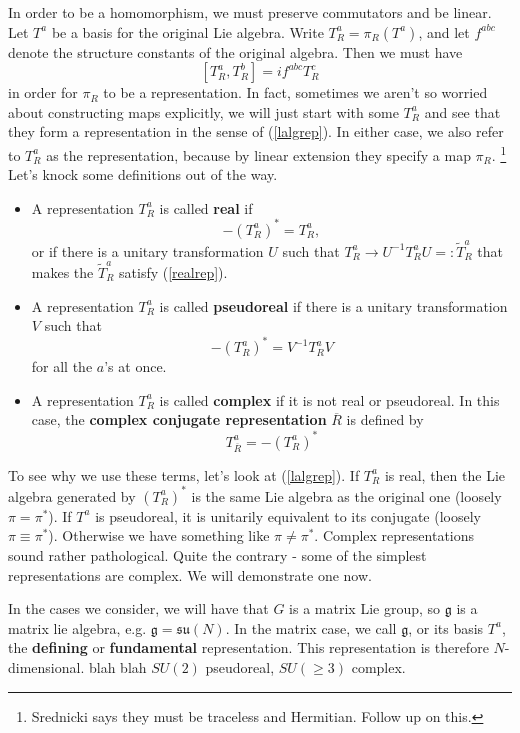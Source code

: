 \documentclass[main.tex]{subfiles}
\begin{document}
In order to be a homomorphism, we must preserve commutators and be linear. Let $T^a$ be a basis for the original Lie algebra. Write $T^a_R = \pi_R (T^a)$, and let $f^{abc}$ denote the structure constants of the original algebra. Then we must have
\begin{equation} \label{lalgrep}
[T^a_R,T^b_R] = i f^{abc} T^c_R
\end{equation}
in order for $\pi_R$ to be a representation. In fact, sometimes we aren't so worried about constructing maps explicitly, we will just start with some $T^a_R$ and see that they form a representation in the sense of (\ref{lalgrep}). In either case, we also refer to $T^a_R$ as the representation, because by linear extension they specify a map $\pi_R$. \footnote{Srednicki says they must be traceless and Hermitian. Follow up on this.} Let's knock some definitions out of the way.
\begin{itemize}
\item A representation $T^a_R$ is called \textbf{real} if 
\begin{equation} \label{realrep}
- (T^a_R)^* = T^a_R,
\end{equation}
or if there is a unitary transformation $U$ such that $T^a_R \to U^{-1} T^a_R U =: \tilde{T}^a_R$ that makes the $\tilde{T}^a_R$ satisfy (\ref{realrep}).
\item A representation $T^a_R$ is called \textbf{pseudoreal} if there is a unitary transformation $V$ such that
\[
-(T^a_R)^* = V^{-1} T^a_R V
\]
for all the $a$'s at once.
\item A representation $T^a_R$ is called \textbf{complex} if it is not real or pseudoreal. In this case, the \textbf{complex conjugate representation} $\overline{R}$ is defined by
\[
T^a_{\overline{R}} = - \left( T^a_R \right)^*
\]
\end{itemize}
To see why we use these terms, let's look at (\ref{lalgrep}). If $T^a_R$ is real, then the Lie algebra generated by $(T^a_R)^*$ is the same Lie algebra as the original one (loosely $\pi = \pi^*$). If $T^a$ is pseudoreal, it is unitarily equivalent to its conjugate (loosely $\pi \equiv \pi^*$). Otherwise we have something like $\pi \neq \pi^*$. Complex representations sound rather pathological. Quite the contrary - some of the simplest representations are complex. We will demonstrate one now.

In the cases we consider, we will have that $G$ is a matrix Lie group, so $\mathfrak{g}$ is a matrix lie algebra, e.g. $\mathfrak{g} = \mathfrak{su}(N)$. In the matrix case, we call $\mathfrak{g}$, or its basis $T^a$, the \textbf{defining} or \textbf{fundamental} representation. This representation is therefore $N$-dimensional. blah blah $SU(2)$ pseudoreal, $SU(\geq 3)$ complex. 
\end{document}
